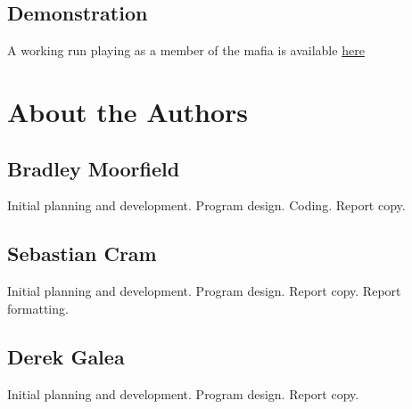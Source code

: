 \documentclass[12pt]{article} %
\begin{document}
\subsection{Demonstration}

A working run playing as a member of the mafia is available
\href{https://www.dropbox.com/s/go9x8617lvtuozv/Mafia%20Demonstration.mp4?dl=0}{here}


\section{About the Authors}

\subsection{Bradley Moorfield}

Initial planning and development. Program design. Coding. Report copy.

\subsection{Sebastian Cram}

Initial planning and development. Program design. Report copy. Report formatting.

\subsection{Derek Galea}

Initial planning and development. Program design. Report copy.



\end{document}
